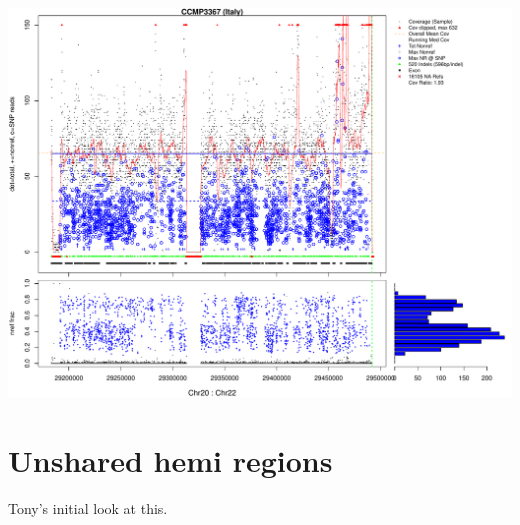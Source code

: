 \documentclass{article}\usepackage[]{graphicx}\usepackage[]{color}
\begin{document}
\includegraphics[width=\textwidth]{figs-mine/chr20x7-07.pdf}

\section{Unshared hemi regions}
Tony's initial look at this.
\end{document}
